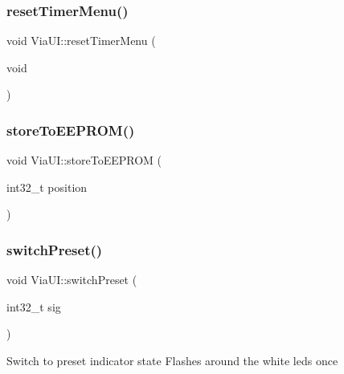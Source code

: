 \mbox{\label{class_via_u_i_ac7abd4e9e7fa598dedab8b4c2486d010}} 
\subsubsection{\texorpdfstring{reset\+Timer\+Menu()}{resetTimerMenu()}}
{\footnotesize\ttfamily void Via\+U\+I\+::reset\+Timer\+Menu (\begin{DoxyParamCaption}\item[{void}]{ }\end{DoxyParamCaption})\hspace{0.3cm}{\ttfamily [inline]}}

\mbox{\label{class_via_u_i_a09fbb5e879fb9e2e77c4642dae4ab83a}} 
\subsubsection{\texorpdfstring{store\+To\+E\+E\+P\+R\+O\+M()}{storeToEEPROM()}}
{\footnotesize\ttfamily void Via\+U\+I\+::store\+To\+E\+E\+P\+R\+OM (\begin{DoxyParamCaption}\item[{int32\+\_\+t}]{position }\end{DoxyParamCaption})}

\mbox{\label{class_via_u_i_af3a811550d54835d446c425dc57fa157}} 
\subsubsection{\texorpdfstring{switch\+Preset()}{switchPreset()}}
{\footnotesize\ttfamily void Via\+U\+I\+::switch\+Preset (\begin{DoxyParamCaption}\item[{int32\+\_\+t}]{sig }\end{DoxyParamCaption})}

Switch to preset indicator state Flashes around the white leds once \mbox{\label{class_via_u_i_a99373a450c4c494a6261edbfc3b21fd9}} 
